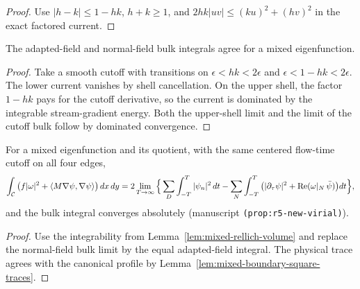 \begin{proof}
\leanok
Use $|h-k|\le 1-hk$, $h+k\ge1$, and
$2hk|uv|\le (ku)^2+(hv)^2$ in the exact factored current.
\end{proof}

\begin{lemma}
\label{lem:mixed-tangential-virial}
\leanok
The adapted-field and normal-field bulk integrals agree for a mixed eigenfunction.
\end{lemma}

\begin{proof}
\leanok
Take a smooth cutoff with transitions on $\epsilon<hk<2\epsilon$ and
$\epsilon<1-hk<2\epsilon$. The lower current vanishes by shell cancellation.
On the upper shell, the factor $1-hk$ pays for the cutoff derivative, so the
current is dominated by the integrable stream-gradient energy. Both the
upper-shell limit and the limit of the cutoff bulk follow by dominated
convergence.
\end{proof}

\begin{proposition}
\label{prop:mixed-virial}
\leanok
For a mixed eigenfunction and its quotient, with the same centered flow-time
cutoff on all four edges,
\[
  \int_{\mathcal{C}} \big(f|\omega|^2+\langle M\nabla\psi,\nabla\psi\rangle\big)\,dx\,dy
  =2\lim_{T\to\infty}\Big\{\sum_D\int_{-T}^T|\psi_n|^2\,dt
  -\sum_N\int_{-T}^T\big(|\partial_\tau\psi|^2+\operatorname{Re}(\omega|_N\,\bar\psi)\big)dt\Big\},
\]
and the bulk integral converges absolutely (manuscript
\texttt{(prop:r5-new-virial)}).
\end{proposition}

\begin{proof}
\leanok
Use the integrability from Lemma~\ref{lem:mixed-rellich-volume} and
replace the normal-field bulk limit by the equal adapted-field integral.
The physical trace agrees with the canonical profile by
Lemma~\ref{lem:mixed-boundary-square-traces}.
\end{proof}

